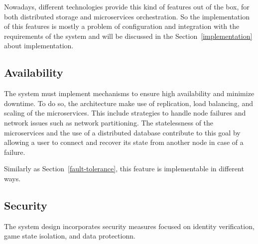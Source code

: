 \documentclass{scrartcl}
\begin{document}
Nowadays, different technologies provide this kind of features out of the box, for both distributed storage and microservices orchestration. So the implementation of this features is mostly a problem of configuration and integration with the requirements of the system and will be discussed in the Section~\ref{implementation} about implementation.

\subsection{Availability}\label{availability}
The system must implement mechanisms to ensure high availability and minimize downtime. To do so, the architecture make use of replication, load balancing, and scaling of the microservices.
This include strategies to handle node failures and network issues such as network partitioning.
The statelessness of the microservices and the use of a distributed database contribute to this goal by allowing a user to connect and recover its state from another node in case of a failure.

Similarly as Section~\ref{fault-tolerance}, this feature is implementable in different ways.

\subsection{Security}\label{security}
The system design incorporates security measures focused on identity verification, game state isolation, and data protectionn.
\end{document}
